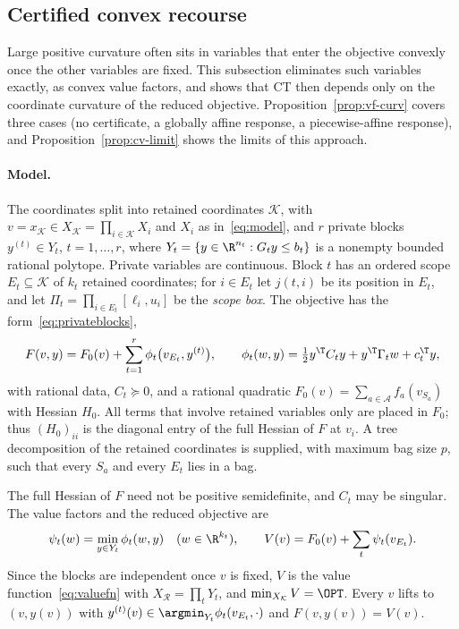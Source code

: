 \subsection{Certified convex recourse}\label{sec:convexrecourse}

Large positive curvature often sits in variables that enter the objective
convexly once the other variables are fixed. This subsection eliminates such
variables exactly, as convex value factors, and shows that CT then depends
only on the coordinate curvature of the reduced objective.
Proposition~\ref{prop:vf-curv} covers three cases (no certificate, a
globally affine response, a piecewise-affine response), and
Proposition~\ref{prop:cv-limit} shows the limits of this approach.

\paragraph{Model.}

\begin{definition}\label{def:cv-model}
The coordinates split into retained coordinates $\mathcal K$, with
$v=x_{\mathcal K}\in X_{\mathcal K}=\prod_{i\in\mathcal K}X_i$ and $X_i$ as
in~\eqref{eq:model}, and $r$ private blocks $y^{(t)}\in Y_t$,
$t=1,\ldots,r$, where $Y_t=\{y\in\R^{n_t}:G_ty\le b_t\}$ is a nonempty
bounded rational polytope. Private variables are continuous. Block $t$ has
an ordered scope $E_t\subseteq\mathcal K$ of $k_t$ retained coordinates; for
$i\in E_t$ let $j(t,i)$ be its position in $E_t$, and let
$\Pi_t=\prod_{i\in E_t}[\ell_i,u_i]$ be the \emph{scope box}. The objective
has the form~\eqref{eq:privateblocks},
\begin{equation}\label{eq:cv-model}
F(v,y)=F_0(v)+\sum_{t=1}^r\phi_t\bigl(v_{E_t},y^{(t)}\bigr),\qquad
\phi_t(w,y)=\tfrac12y^{\T}C_ty+y^{\T}\Gamma_tw+c_t^{\T}y,
\end{equation}
with rational data, $C_t\succeq0$, and a rational quadratic
$F_0(v)=\sum_{a\in\mathcal A}f_a(v_{S_a})$ with Hessian $H_0$. All terms
that involve retained variables only are placed in $F_0$; thus $(H_0)_{ii}$
is the diagonal entry of the full Hessian of $F$ at $v_i$. A tree
decomposition of the retained coordinates is supplied, with maximum bag size
$p$, such that every $S_a$ and every $E_t$ lies in a bag.
\end{definition}

The full Hessian of $F$ need not be positive semidefinite, and $C_t$ may be
singular. The value factors and the reduced objective are
\begin{equation}\label{eq:cv-value}
\psi_t(w)=\min_{y\in Y_t}\phi_t(w,y)\quad(w\in\R^{k_t}),\qquad
V(v)=F_0(v)+\sum_t\psi_t(v_{E_t}).
\end{equation}
Since the blocks are independent once $v$ is fixed, $V$ is the value
function~\eqref{eq:valuefn} with $X_{\mathcal R}=\prod_tY_t$, and
$\min_{X_{\mathcal K}}V=\OPT$. Every $v$ lifts to $(v,y(v))$ with
$y^{(t)}(v)\in\argmin_{Y_t}\phi_t(v_{E_t},\cdot)$ and $F(v,y(v))=V(v)$.

